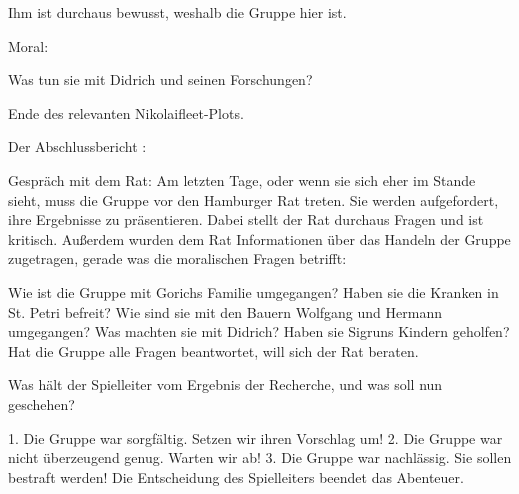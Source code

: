 Ihm ist durchaus bewusst, weshalb die Gruppe hier ist.


Moral:

Was tun sie mit Didrich und seinen Forschungen?

Ende des relevanten Nikolaifleet-Plots.

Der Abschlussbericht
:

Gespräch mit dem Rat: Am letzten Tage, oder wenn sie sich eher im Stande sieht, muss die Gruppe vor den Hamburger Rat treten. Sie werden aufgefordert, ihre Ergebnisse zu präsentieren. Dabei stellt der Rat durchaus Fragen und ist kritisch. Außerdem wurden dem Rat Informationen über das Handeln der Gruppe zugetragen, gerade was die moralischen Fragen betrifft:

Wie ist die Gruppe mit Gorichs Familie umgegangen?
Haben sie die Kranken in St. Petri befreit?
Wie sind sie mit den Bauern Wolfgang und Hermann umgegangen?
Was machten sie mit Didrich?
Haben sie Sigruns Kindern geholfen?
Hat die Gruppe alle Fragen beantwortet, will sich der Rat beraten.

Was hält der Spielleiter vom Ergebnis der Recherche, und was soll nun geschehen?

1. Die Gruppe war sorgfältig. Setzen wir ihren Vorschlag um!
2. Die Gruppe war nicht überzeugend genug. Warten wir ab!
3. Die Gruppe war nachlässig. Sie sollen bestraft werden!
Die Entscheidung des Spielleiters beendet das Abenteuer.
